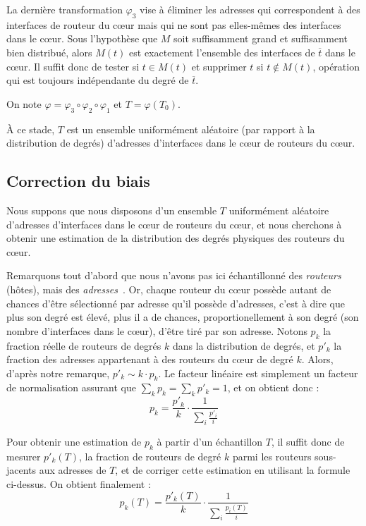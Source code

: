 La dernière transformation $\varphi_3$ vise à éliminer les adresses qui
correspondent à des interfaces de routeur du c\oe{}ur mais qui ne sont pas
elles-mêmes des interfaces dans le c\oe{}ur. Sous l'hypothèse que $M$ soit
suffisamment grand et suffisamment bien distribué, alors $M(t)$ est exactement
l'ensemble des interfaces de $\overline{t}$ dans le c\oe{}ur. Il suffit donc de
tester si $t \in M(t)$ et supprimer $t$ si $t \notin M(t)$, opération qui est
toujours indépendante du degré de $\overline{t}$.

On note $\varphi = \varphi_3 \circ \varphi_2 \circ \varphi_1$ et $T =
\varphi(T_0)$.

À ce stade, $T$ est un ensemble uniformément aléatoire (par rapport à la
distribution de degrés) d'adresses d'interfaces dans le c\oe{}ur de routeurs du
c\oe{}ur.

\subsection{Correction du biais}
\label{subsec:udpping-many-to-many-bias}

Nous suppons que nous disposons d'un ensemble $T$ uniformément aléatoire
d'adresses d'interfaces dans le c\oe{}ur de routeurs du c\oe{}ur, et nous cherchons à
obtenir une estimation de la distribution des degrés physiques des routeurs du
c\oe{}ur.

Remarquons tout d'abord que nous n'avons pas ici échantillonné des {\em
routeurs} (hôtes), mais des {\em adresses~\ip}. Or, chaque routeur du c\oe{}ur
possède autant de chances d'être sélectionné par adresse qu'il possède
d'adresses, c'est à dire que plus son degré est élevé, plus il a de chances,
proportionellement à son degré (son nombre d'interfaces dans le c\oe{}ur), d'être
tiré par son adresse.
Notons $p_k$ la fraction réelle de routeurs de degrés $k$ dans la distribution
de degrés, et $p'_k$ la fraction des adresses appartenant à des routeurs du
c\oe{}ur de degré $k$. Alors, d'après notre remarque, $p'_k \sim k \cdot
p_k$.
Le facteur linéaire est simplement un facteur de normalisation assurant que
$\sum_k p_k = \sum_k p'_k = 1$, et on obtient donc :
$$ p_k = \frac{p'_k}{k} \cdot \frac {1}{\sum_i \frac{p'_i}{i}} $$

Pour obtenir une estimation de $p_k$ à partir d'un échantillon $T$, il suffit
donc de mesurer $p'_k(T)$, la fraction de routeurs de degré $k$ parmi les
routeurs sous-jacents aux adresses de $T$, et de corriger cette estimation en
utilisant la formule ci-dessus. On obtient finalement :
$$ p_k(T) = \frac {p'_k(T)}{k} \cdot \frac {1}{\sum_i \frac{p_i(T)}{i}} $$

